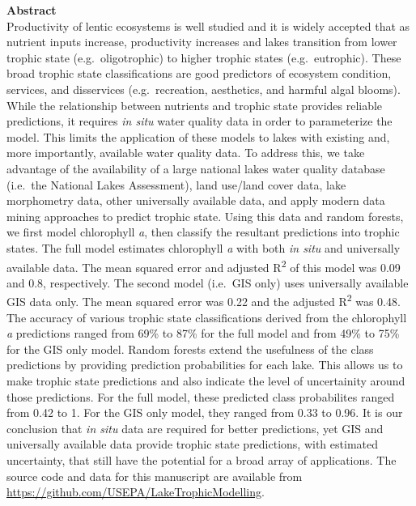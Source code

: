 \documentclass[11pt,]{article}
\begin{document}
\textbf{Abstract}\\Productivity of lentic ecosystems is well studied and
it is widely accepted that as nutrient inputs increase, productivity
increases and lakes transition from lower trophic state
(e.g.~oligotrophic) to higher trophic states (e.g.~eutrophic). These
broad trophic state classifications are good predictors of ecosystem
condition, services, and disservices (e.g.~recreation, aesthetics, and
harmful algal blooms). While the relationship between nutrients and
trophic state provides reliable predictions, it requires \emph{in situ}
water quality data in order to parameterize the model. This limits the
application of these models to lakes with existing and, more
importantly, available water quality data. To address this, we take
advantage of the availability of a large national lakes water quality
database (i.e.~the National Lakes Assessment), land use/land cover data,
lake morphometry data, other universally available data, and apply
modern data mining approaches to predict trophic state. Using this data
and random forests, we first model chlorophyll \emph{a}, then classify
the resultant predictions into trophic states. The full model estimates
chlorophyll \emph{a} with both \emph{in situ} and universally available
data. The mean squared error and adjusted R\textsuperscript{2} of this
model was 0.09 and 0.8, respectively. The second model (i.e.~GIS only)
uses universally available GIS data only. The mean squared error was
0.22 and the adjusted R\textsuperscript{2} was 0.48. The accuracy of
various trophic state classifications derived from the chlorophyll
\emph{a} predictions ranged from 69\% to 87\% for the full model and
from 49\% to 75\% for the GIS only model. Random forests extend the
usefulness of the class predictions by providing prediction
probabilities for each lake. This allows us to make trophic state
predictions and also indicate the level of uncertainity around those
predictions. For the full model, these predicted class probabilites
ranged from 0.42 to 1. For the GIS only model, they ranged from 0.33 to
0.96. It is our conclusion that \emph{in situ} data are required for
better predictions, yet GIS and universally available data provide
trophic state predictions, with estimated uncertainty, that still have
the potential for a broad array of applications. The source code and
data for this manuscript are available from
\url{https://github.com/USEPA/LakeTrophicModelling}.

\vspace{3mm}
\end{document}
